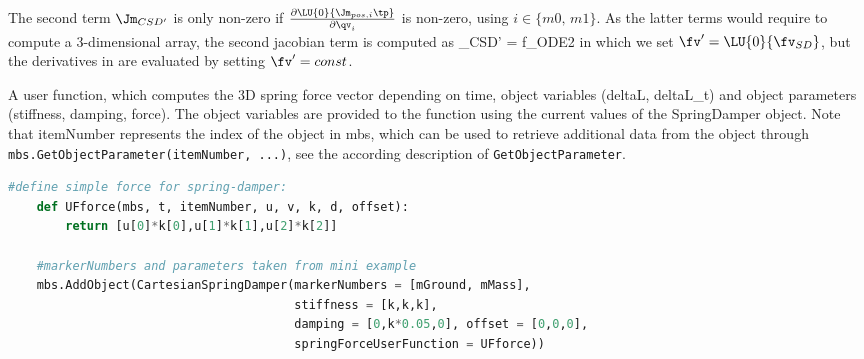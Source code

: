     The second term $\Jm_{CSD'}$ is only non-zero if $\frac{\partial \LU{0}{\Jm_{pos,i}\tp}}{\partial \qv_{i}}$ is non-zero, using $i \in \{m0, \, m1\}$.
    As the latter terms would require to compute a 3-dimensional array, the second jacobian term is computed as 
    \be \label{eq_ObjectCartesianSpringDamper_jacDeriv}
      \Jm_{CSD'} = 
                      { f_{ODE2}}
    \ee
    in which we set $\fv' = \LU{0}{\fv_{SD}}$, but the derivatives in  are evaluated by setting $\fv' = const$.

    A user function, which computes the 3D spring force vector depending on time, object variables (deltaL, deltaL\_t) and object parameters 
    (stiffness, damping, force).
    The object variables are provided to the function using the current values of the SpringDamper object.
    Note that itemNumber represents the index of the object in mbs, which can be used to retrieve additional data from the object through
    \texttt{mbs.GetObjectParameter(itemNumber, ...)}, see the according description of \texttt{GetObjectParameter}.
    \finishTable
    \userFunctionExample{}
    \pythonstyle
    \begin{lstlisting}[language=Python]
    #define simple force for spring-damper:
    def UFforce(mbs, t, itemNumber, u, v, k, d, offset): 
        return [u[0]*k[0],u[1]*k[1],u[2]*k[2]]
    
    #markerNumbers and parameters taken from mini example
    mbs.AddObject(CartesianSpringDamper(markerNumbers = [mGround, mMass], 
                                        stiffness = [k,k,k], 
                                        damping = [0,k*0.05,0], offset = [0,0,0],
                                        springForceUserFunction = UFforce))
    \end{lstlisting}
